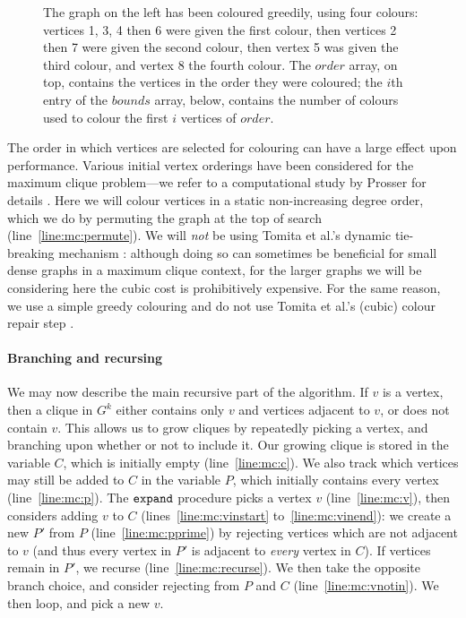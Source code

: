 \documentclass[letterpaper]{article}
\newcommand{\mcline}[1]{line~\ref{line:mc:#1}}
\newcommand{\mclinerange}[2]{lines~\ref{line:mc:#1} to~\ref{line:mc:#2}}
\newcommand{\bounds}{\mathit{bounds}}
\newcommand{\order}{\mathit{order}}
\newcommand{\expand}{\FuncSty{expand}}
\begin{document}
\begin{figure}[b]

    \caption{The graph on the left has been coloured greedily, using four
        colours: vertices 1, 3, 4 then 6 were given the first colour, then
        vertices 2 then 7 were given the second colour, then vertex 5 was given
        the third colour, and vertex 8 the fourth colour. The $\order$ array,
        on top, contains the vertices in the order they were coloured; the
        $i$th entry of the $\bounds$ array, below, contains the number of colours
        used to colour the first $i$ vertices of $\order$.}
    \label{figure:colours}
\end{figure}

The order in which vertices are selected for colouring can have a large effect upon performance.
Various initial vertex orderings have been considered for the maximum clique problem---we refer to a
computational study by Prosser for details \cite{Prosser:2012}. Here we will colour vertices in a
static non-increasing degree order, which we do by permuting the graph at the top of search
(\mcline{permute}). We will \emph{not} be using Tomita et al.'s dynamic tie-breaking mechanism
\cite{Tomita:2010}: although doing so can sometimes be beneficial for small dense graphs in a
maximum clique context, for the larger graphs we will be considering here the cubic cost is
prohibitively expensive. For the same reason, we use a simple greedy colouring and do not use Tomita
et al.'s (cubic) colour repair step \cite{Tomita:2010}.

\paragraph{Branching and recursing}

We may now describe the main recursive part of the algorithm. If $v$ is a vertex, then a clique in
$G^k$ either contains only $v$ and vertices adjacent to $v$, or does not contain $v$. This allows us
to grow cliques by repeatedly picking a vertex, and branching upon whether or not to include it. Our
growing clique is stored in the variable $C$, which is initially empty (\mcline{c}). We also track
which vertices may still be added to $C$ in the variable $P$, which initially contains every vertex
(\mcline{p}). The $\expand$ procedure picks a vertex $v$ (\mcline{v}), then considers adding $v$ to
$C$ (\mclinerange{vinstart}{vinend}): we create a new $P'$ from $P$ (\mcline{pprime}) by
rejecting vertices which are not adjacent to $v$ (and thus every vertex in $P'$ is adjacent to
\emph{every} vertex in $C$). If vertices remain in $P'$, we recurse (\mcline{recurse}). We then take
the opposite branch choice, and consider rejecting from $P$ and $C$
(\mcline{vnotin}). We then loop, and pick a new $v$.
\end{document}
